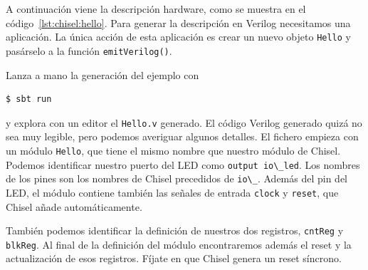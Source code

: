 \documentclass[%
    10pt,
    headinclude, footinclude=false,
    openright, %
    notitlepage,
    cleardoublepage=empty,
    headsepline,
    numbers=noenddot,
    bibliography=totoc, index=totoc,
    ]{scrbook}
\newcommand{\code}[1]{{\lstinline[basicstyle=\small\ttfamily]{#1}}}
\begin{document}
\noindent A continuación viene la descripción hardware, como se muestra en el código~\ref{lst:chisel:hello}.
Para generar la descripción en Verilog necesitamos una aplicación.
La única acción de esta aplicación es crear un nuevo objeto \code{Hello} y pasárselo
a la función \code{emitVerilog()}.



\noindent Lanza a mano la generación del ejemplo con

\begin{verbatim}
$ sbt run
\end{verbatim}


y explora con un editor el \code{Hello.v} generado. El código Verilog generado quizá no sea
muy legible, pero podemos averiguar algunos detalles. El fichero empieza con un módulo \code{Hello},
que tiene el mismo nombre que nuestro módulo de Chisel. Podemos identificar nuestro puerto del LED como
\code{output io\_led}. Los nombres de los pines son los nombres de Chisel precedidos de \code{io\_}.
Además del pin del LED, el módulo contiene también las señales de entrada \code{clock} y \code{reset},
que Chisel añade automáticamente.


También podemos identificar la definición de nuestros dos registros, \code{cntReg} y \code{blkReg}.
Al final de la definición del módulo encontraremos además el reset y la actualización de esos registros.
Fíjate en que Chisel genera un reset síncrono.

\end{document}
